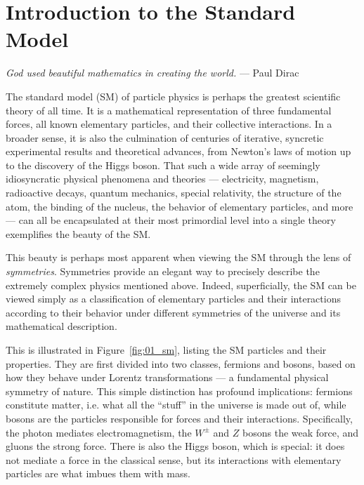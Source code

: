
\chapter{Introduction to the Standard Model}
\label{sec:01_intro}

\begin{center}
	\centering
	\noindent
	\textit{God used beautiful mathematics in creating the world.} --- Paul Dirac~\cite{pagels2012cosmic}
\end{center}

\baselineskip

The standard model (SM) of particle physics is perhaps the greatest scientific theory of all time.
It is a mathematical representation of three fundamental forces, all known elementary particles, and their collective interactions.
In a broader sense, it is also the culmination of centuries of iterative, syncretic experimental results and theoretical advances, from Newton's laws of motion up to the discovery of the Higgs boson.
That such a wide array of seemingly idiosyncratic physical phenomena and theories --- electricity, magnetism, radioactive decays, quantum mechanics, special relativity, the structure of the atom, the binding of the nucleus, the behavior of elementary particles, and more --- can all be encapsulated at their most primordial level into a single theory exemplifies the beauty of the SM.

This beauty is perhaps most apparent when viewing the SM through the lens of \textit{symmetries}.
Symmetries provide an elegant way to precisely describe the extremely complex physics mentioned above. 
Indeed, superficially, the SM can be viewed simply as a classification of elementary particles and their interactions according to their behavior under different symmetries of the universe and its mathematical description.

This is illustrated in Figure~\ref{fig:01_sm}, listing the SM particles and their properties.
They are first divided into two classes, fermions and bosons, based on how they behave under Lorentz transformations --- a fundamental physical symmetry of nature.
This simple distinction has profound implications: fermions constitute matter, i.e. what all the ``stuff'' in the universe is made out of, while bosons are the particles responsible for forces and their interactions.
Specifically, the photon mediates electromagnetism, the $W^{\pm}$ and $Z$ bosons the weak force, and gluons the strong force.
There is also the Higgs boson, which is special: it does not mediate a force in the classical sense, but its interactions with elementary particles are what imbues them with mass.

